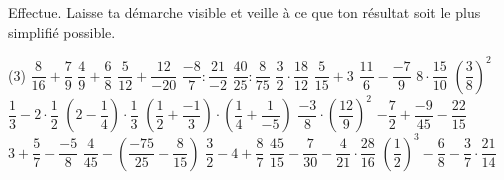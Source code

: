 %
%
Effectue. Laisse ta démarche visible et veille à ce que ton résultat soit le plus simplifié possible.
  \begin{tasks}(3)
    \task $\dfrac{8}{16}+\dfrac{7}{9}$
    \task $\dfrac{4}{9}+\dfrac{6}{8}$
    \task $\dfrac{5}{12}+\dfrac{12}{-20}$
    \task $\dfrac{-8}{7} : \dfrac{21}{-2}$
    \task $\dfrac{40}{25} : \dfrac{8}{75}$
    \task $\dfrac{3}{2}\cdot \dfrac{18}{12}$
    \task $\dfrac{5}{15} + 3$
    \task $\dfrac{11}{6} - \dfrac{-7}{9}$
    \task $8 \cdot \dfrac{15}{10}$
    \task $\left(\dfrac{3}{8}\right)^2$
    \task $\dfrac{1}{3}-2\cdot\dfrac{1}{2}$
    \task $\left(2-\dfrac{1}{4}\right) \cdot \dfrac{1}{3}$
    \task $\left(\dfrac{1}{2}+\dfrac{-1}{3}\right) \cdot \left(\dfrac{1}{4}+\dfrac{1}{-5}\right)$
    \task $\dfrac{-3}{8}\cdot \left(\dfrac{12}{9}\right)^2$
    \task $-\dfrac{7}{2}+\dfrac{-9}{45} - \dfrac{22}{15}$
    \task $3+\dfrac{5}{7} - \dfrac{-5}{8}$
    \task $\dfrac{4}{45}-\left(\dfrac{-75}{25} - \dfrac{8}{15}\right)$
    \task $\dfrac{3}{2} -4 +\dfrac{8}{7}$
    \task $\dfrac{45}{15}-\dfrac{7}{30} - \dfrac{4}{21}\cdot \dfrac{28}{16}$
    \task $\left(\dfrac{1}{2}\right)^3 - \dfrac{6}{8} - \dfrac{3}{7} \cdot \dfrac{21}{14}$
  \end{tasks}
